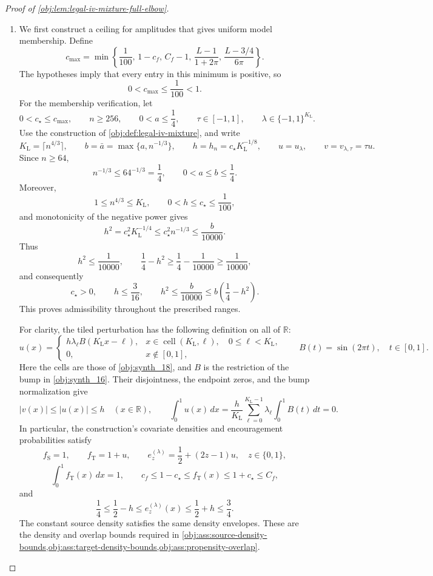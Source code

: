 \begin{proof}[Proof of \cref{obj:lem:legal-iv-mixture-full-elbow}]
\begin{enumerate}
\item
We first construct a ceiling for amplitudes that gives uniform model membership. Define
\[
c_{\max}
=
\min\left\{
\frac1{100},\,
1-c_f,\,
C_f-1,\,
\frac{L-1}{1+2\pi},\,
\frac{L-3/4}{6\pi}
\right\}.
\]
The hypotheses imply that every entry in this minimum is positive, so
\[
0<c_{\max}\le\frac1{100}<1.
\]
For the membership verification, let
\[
0<c_{\star}\le c_{\max},\qquad
n\ge256,\qquad
0<a\le\frac14,\qquad
\tau\in[-1,1],\qquad
\lambda\in\{-1,1\}^{K_{\mathrm L}}.
\]
Use the construction of \cref{obj:def:legal-iv-mixture}, and write
\[
K_{\mathrm L}=\lceil n^{4/3}\rceil,\qquad
b=\bar a=\max\{a,n^{-1/3}\},\qquad
h=h_n=c_{\star}K_{\mathrm L}^{-1/8},\qquad
u=u_{\lambda},\qquad v=v_{\lambda,\tau}=\tau u.
\]
Since \(n\ge64\),
\[
n^{-1/3}\le64^{-1/3}=\frac14,
\qquad
0<a\le b\le\frac14.
\]
Moreover,
\[
1\le n^{4/3}\le K_{\mathrm L},
\qquad
0<h\le c_{\star}\le\frac1{100},
\]
and monotonicity of the negative power gives
\[
h^2=c_{\star}^2K_{\mathrm L}^{-1/4}
\le c_{\star}^2n^{-1/3}
\le\frac{b}{10000}.
\]
Thus
\[
h^2\le\frac1{10000},
\qquad
\frac14-h^2\ge\frac14-\frac1{10000}\ge\frac1{10000},
\]
and consequently
\[
c_{\star}>0,\qquad
h\le\frac3{16},\qquad
h^2\le\frac{b}{10000}
\le b\left(\frac14-h^2\right).
\]
This proves admissibility throughout the prescribed ranges.

For clarity, the tiled perturbation has the following definition on all of \(\mathbb R\):
\[
u(x)=
\begin{cases}
h\lambda_{\ell}B(K_{\mathrm L}x-\ell),
&x\in\operatorname{cell}(K_{\mathrm L},\ell),
\quad 0\le\ell<K_{\mathrm L},\\
0,&x\notin[0,1],
\end{cases}
\qquad
B(t)=\sin(2\pi t),\quad t\in[0,1].
\]
Here the cells are those of \cref{obj:synth_18}, and \(B\) is the restriction of the bump in \cref{obj:synth_16}. Their disjointness, the endpoint zeros, and the bump normalization give
\[
|v(x)|\le |u(x)|\le h
\quad(x\in\mathbb R),
\qquad
\int_0^1u(x)\,dx
=
\frac{h}{K_{\mathrm L}}
\sum_{\ell=0}^{K_{\mathrm L}-1}
\lambda_{\ell}\int_0^1B(t)\,dt
=0.
\]
In particular, the construction's covariate densities and encouragement probabilities satisfy
\[
f_{\mathrm S}=1,\qquad f_{\mathrm T}=1+u,\qquad
e_z^{(\lambda)}=\frac12+(2z-1)u,\quad z\in\{0,1\},
\]
\[
\int_0^1f_{\mathrm T}(x)\,dx=1,
\qquad
c_f\le1-c_{\star}\le f_{\mathrm T}(x)
\le1+c_{\star}\le C_f,
\]
and
\[
\frac14\le\frac12-h
\le e_z^{(\lambda)}(x)
\le\frac12+h\le\frac34.
\]
The constant source density satisfies the same density envelopes. These are the density and overlap bounds required in
\cref{obj:ass:source-density-bounds,obj:ass:target-density-bounds,obj:ass:propensity-overlap}.


\end{enumerate}
\end{proof}

